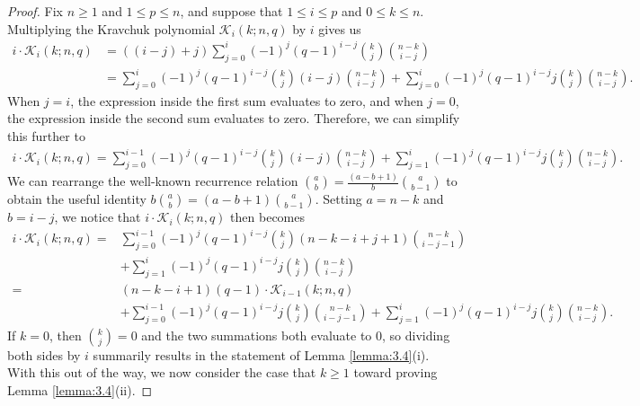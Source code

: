 \documentclass[10pt,a4paper]{amsart}
\def\K{\mathcal{K}}
\begin{document}
\begin{proof}
    Fix $n \ge 1$ and $1 \le p \le n$, and suppose that $1 \le i \le p$ and $0 \le k \le n$. Multiplying the Kravchuk polynomial $\K_i(k; n, q)$ by $i$ gives us
    \begin{align*}
        i \cdot \K_i(k; n, q) & = ((i - j) + j) \sum_{j = 0}^i (-1)^j (q - 1)^{i - j} \binom{k}{j} \binom{n - k}{i - j} \\
        & = \sum_{j = 0}^i (-1)^j (q - 1)^{i - j} \binom{k}{j} (i - j) \binom{n - k}{i - j} + \sum_{j = 0}^i (-1)^j (q - 1)^{i - j} j \binom{k}{j} \binom{n - k}{i - j}.
    \end{align*}
    When $j = i$, the expression inside the first sum evaluates to zero, and when $j = 0$, the expression inside the second sum evaluates to zero. Therefore, we can simplify this further to
    \begin{align*}
        i \cdot \K_i(k; n, q) = \sum_{j = 0}^{i - 1} (-1)^j (q - 1)^{i - j} \binom{k}{j} (i - j) \binom{n - k}{i - j} + \sum_{j = 1}^i (-1)^j (q - 1)^{i - j} j \binom{k}{j} \binom{n - k}{i - j}.
    \end{align*}
    We can rearrange the well-known recurrence relation $\binom{a}{b} = \frac{(a - b + 1)}{b}\binom{a}{b - 1}$ to obtain the useful identity $b\binom{a}{b} = (a - b + 1)\binom{a}{b - 1}$. Setting $a = n - k$ and $b = i - j$, we notice that $i \cdot \K_i(k; n, q)$ then becomes
    \begin{align*}
        i \cdot \K_i(k; n, q) ={} & \sum_{j = 0}^{i - 1} (-1)^j (q - 1)^{i - j} \binom{k}{j} (n - k - i + j + 1) \binom{n - k}{i - j - 1} \\
        & + \sum_{j = 1}^i (-1)^j (q - 1)^{i - j} j \binom{k}{j} \binom{n - k}{i - j} \\
        ={} & (n - k - i + 1)(q - 1) \cdot \K_{i - 1}(k; n, q) \\
        & + \sum_{j = 0}^{i - 1} (-1)^j (q - 1)^{i - j} j \binom{k}{j} \binom{n - k}{i - j - 1} + \sum_{j = 1}^i (-1)^j (q - 1)^{i - j} j \binom{k}{j} \binom{n - k}{i - j}.
    \end{align*}
    If $k = 0$, then $\binom{k}{j} = 0$ and the two summations both evaluate to $0$, so dividing both sides by $i$ summarily results in the statement of Lemma \ref{lemma:3.4}(i). With this out of the way, we now consider the case that $k \ge 1$ toward proving Lemma \ref{lemma:3.4}(ii).


\end{proof}
\end{document}
